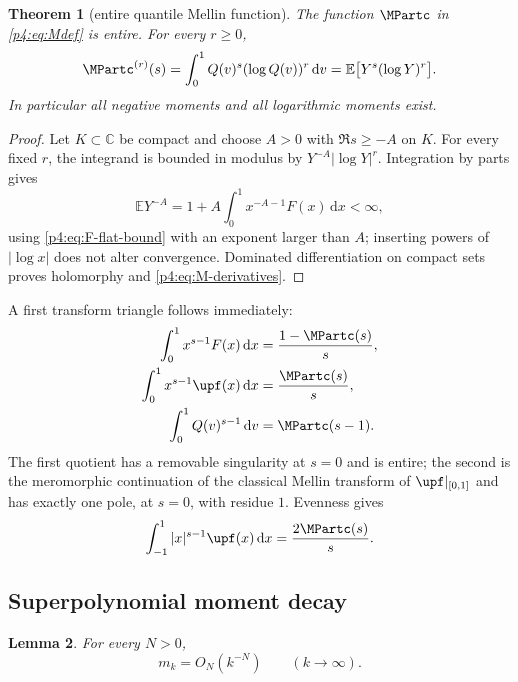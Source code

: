 \documentclass[11pt,oneside]{article}
\newtheorem{theorem}{Theorem}[section]
\newtheorem{lemma}[theorem]{Lemma}
\theoremstyle{definition}
\theoremstyle{remark}
\newcommand{\F}{F}
\newcommand{\Q}{Q}
\newcommand{\E}{\mathbb E}
\newcommand{\C}{\mathbb C}
\newcommand{\dd}{\,\mathrm d}
\newcommand{\1}{\mathbf 1}
\begin{document}
\begin{theorem}[entire quantile Mellin function]\label{p4:thm:entireM}
The function \(\MPartc\) in \cref{p4:eq:Mdef} is entire.  For every \(r\ge0\),
\begin{equation}\label{p4:eq:M-derivatives}
 \MPartc^{(r)}(s)=\int_0^1\Q(v)^s(\log\Q(v))^r\dd v
 =\E\bigl[Y^s(\log Y)^r\bigr].
\end{equation}
In particular all negative moments and all logarithmic moments exist.
\end{theorem}

\begin{proof}
Let \(K\subset\C\) be compact and choose \(A>0\) with \(\Re s\ge-A\) on \(K\).
For every fixed \(r\), the integrand is bounded in modulus by
\(Y^{-A}|\log Y|^r\).  Integration by parts gives
\[
 \E Y^{-A}=1+A\int_0^1x^{-A-1}\F(x)\dd x<\infty,
\]
using \cref{p4:eq:F-flat-bound} with an exponent larger than \(A\); inserting powers of
\(|\log x|\) does not alter convergence.  Dominated differentiation on compact sets
proves holomorphy and \cref{p4:eq:M-derivatives}.
\end{proof}

A first transform triangle follows immediately:
\begin{align}
 \int_0^1x^{s-1}\F(x)\dd x&=\frac{1-\MPartc(s)}s,
 \label{p4:eq:Mellin-F}\\
 \int_0^1x^{s-1}\upf(x)\dd x&=\frac{\MPartc(s)}s,
 \label{p4:eq:Mellin-up-half}\\
 \int_0^1\Q(v)^{s-1}\dd v&=\MPartc(s-1).
 \label{p4:eq:Mellin-Q}
\end{align}
The first quotient has a removable singularity at \(s=0\) and is entire; the second
is the meromorphic continuation of the classical Mellin transform of \(\upf|_{[0,1]}\)
and has exactly one pole, at \(s=0\), with residue \(1\).  Evenness gives
\begin{equation}\label{p4:eq:absolute-Mellin-up}
 \int_{-1}^1|x|^{s-1}\upf(x)\dd x=\frac{2\MPartc(s)}s.
\end{equation}

\subsection{Superpolynomial moment decay}

\begin{lemma}\label{p4:lem:moment-decay}
For every \(N>0\),
\begin{equation}\label{p4:eq:moment-decay}
 m_k=O_N(k^{-N})\qquad(k\to\infty).
\end{equation}
\end{lemma}
\end{document}
